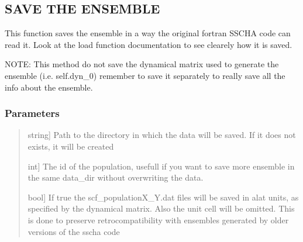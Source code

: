 \documentclass[a4paper,11pt,english]{sphinxmanual}
\begin{document}
\begin{fulllineitems}
\begin{fulllineitems}
\end{fulllineitems}


\begin{fulllineitems}
\label{\detokenize{apireference:sscha.Ensemble.Ensemble.save}}
\pysigstartsignatures
{}
\pysigstopsignatures

\subsection{SAVE THE ENSEMBLE}
\label{\detokenize{apireference:save-the-ensemble}}
\sphinxAtStartPar
This function saves the ensemble in a way the original fortran SSCHA code can read it.
Look at the load function documentation to see clearely how it is saved.

\sphinxAtStartPar
NOTE: This method do not save the dynamical matrix used to generate the ensemble (i.e. self.dyn\_0)
remember to save it separately to really save all the info about the ensemble.


\subsubsection{Parameters}
\label{\detokenize{apireference:id21}}\begin{quote}
\begin{description}
\sphinxlineitem{data\_dir}{[}string{]}
\sphinxAtStartPar
Path to the directory in which the data will be saved. If it does not exists, it will be created

\sphinxlineitem{population}{[}int{]}
\sphinxAtStartPar
The id of the population, usefull if you want to save more ensemble in the same data\_dir without overwriting
the data.

\sphinxlineitem{use\_alat}{[}bool{]}
\sphinxAtStartPar
If true the scf\_populationX\_Y.dat files will be saved in alat units, as specified by the dynamical matrix.
Also the unit cell will be omitted. This is done to preserve retrocompatibility with ensembles generated by
older versions of the sscha code

\end{description}
\end{quote}


\end{fulllineitems}
\end{fulllineitems}
\end{document}
